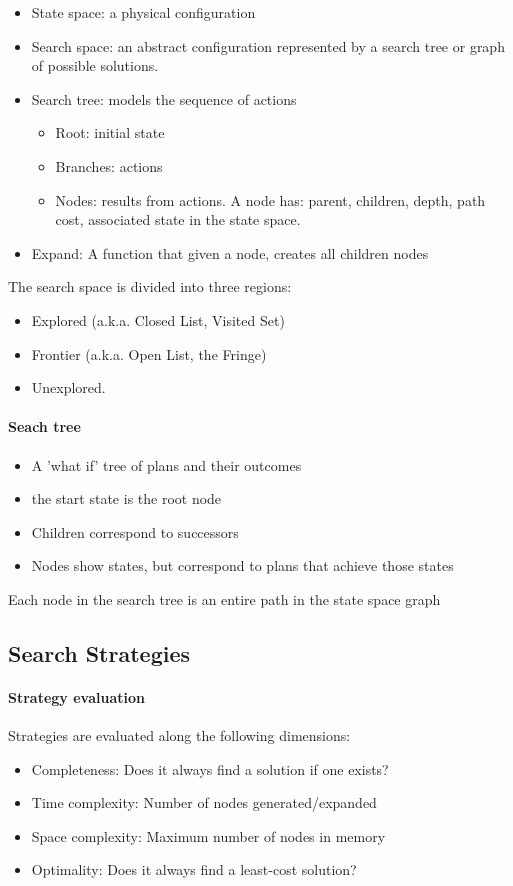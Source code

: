 \begin{itemize}
  \item State space: a physical configuration
  \item Search space: an abstract configuration represented by a search tree or graph of possible solutions.
  \item Search tree: models the sequence of actions
    \begin{itemize}
      \item Root: initial state
      \item Branches: actions
      \item Nodes: results from actions. A node has: parent, children, depth, path cost, associated state in the state space.
    \end{itemize}
  \item Expand: A function that given a node, creates all children nodes
\end{itemize}

The search space is divided into three regions:
\begin{itemize}
  \item Explored (a.k.a. Closed List, Visited Set)
  \item Frontier (a.k.a. Open List, the Fringe)
  \item Unexplored.
\end{itemize}

\paragraph{Seach tree} 
\begin{itemize}
    \item A 'what if' tree of plans and their outcomes
    \item the start state is the root node
    \item Children correspond to successors
    \item Nodes show states, but correspond to plans that achieve those states
\end{itemize}
Each node in the search tree is an entire path in the state space graph


\subsection{Search Strategies}

\paragraph{Strategy evaluation} Strategies are evaluated along
the following dimensions:
\begin{itemize}
  \item Completeness: Does it always find a solution if one
    exists?
  \item Time complexity: Number of nodes generated/expanded
  \item Space complexity: Maximum number of nodes in memory
  \item Optimality: Does it always find a least-cost solution?
\end{itemize}

